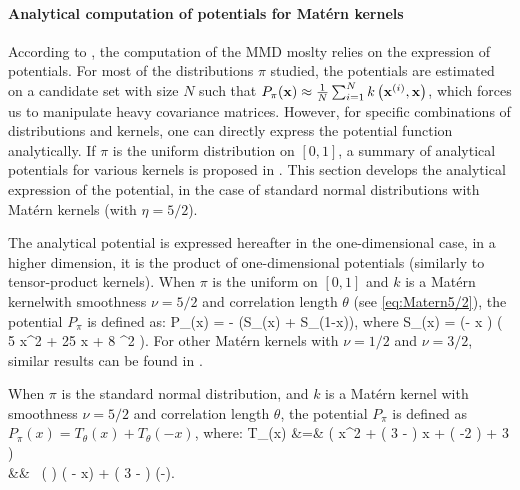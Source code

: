 \paragraph*{Analytical computation of potentials for Mat\'ern kernels}
According to , the computation of the MMD moslty relies on the expression of potentials. 
For most of the distributions $\pi$ studied, the potentials are estimated on a candidate set with size $N$ such that $P_\pi({\bf x}) \approx \frac1N \sum_{i=1}^N k\left({\bf x}^{(i)}, {\bf x}\right)$, which forces us to manipulate heavy covariance matrices. 
However, for specific combinations of distributions and kernels, one can directly express the potential function analytically. 
If $\pi$ is the uniform distribution on $[0, 1]$, a summary of analytical potentials for various kernels is proposed in \citet[Table 1]{pronzato_zhigljavsky_2020}. 
This section develops the analytical expression of the potential, in the case of standard normal distributions with Matérn kernels (with $\eta=5/2$).

The analytical potential is expressed hereafter in the one-dimensional case, in a higher dimension, it is the product of one-dimensional potentials (similarly to tensor-product kernels). 
When $\pi$ is the uniform on $[0,1]$ and $k$ is a Matérn kernelwith smoothness $\nu=5/2$ and correlation length $\theta$ (see \eqref{eq:Matern5/2}), the potential $P_{\pi}$ is defined as:
\bea
    P_{\pi}(x) =  -  (S_\theta(x) + S_\theta(1-x)),
\eea
where
\bea
\nonumber
    S_\theta(x) = 
    \exp\left(-  x \right) 
    \left( 5  x^2 + 25 \theta x + 8  \theta^2 \right).
\eea
For other Matérn kernels with $\nu=1/2$ and $\nu=3/2$, similar results can be found in \citet{pronzato_zhigljavsky_2020}. 

When $\pi$ is the standard normal distribution, and $k$ is a Matérn kernel with smoothness $\nu=5/2$ and correlation length $\theta$, the potential $P_{\pi}$ is defined as $P_{\pi}(x) = T_\theta(x) + T_\theta(-x)$, where:
\bea
T_\theta(x) &=&
    \left( 
         x^2 + 
        \left( 3 -  \right)  x +  \left(  -2 \right) + 3
    \right) \\
    && \times\,  \left(  \right)
    \exp\left( - x\right) +   
    \left( 3 -  \right) \exp\left(-\right). 
\eea